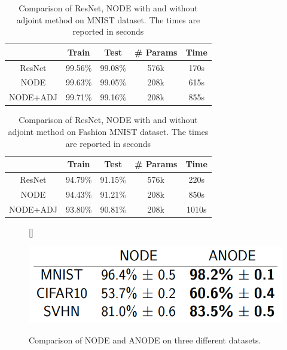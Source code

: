 \documentclass{article}
\begin{document}
	
	\begin{table}
		{\caption{Comparison of ResNet, NODE with and without adjoint method on MNIST dataset. The times are reported in seconds}\label{tbl:bench1}}
		{\begin{tabular}{@{}ccccc@{}}
				\toprule
				& Train   & Test    & \# Params & Time \\ \midrule
				ResNet   & 99.56\% & 99.08\% & 576k      & 170s \\
				NODE     & 99.63\% & 99.05\% & 208k      & 615s \\
				NODE+ADJ & 99.71\% & 99.16\% & 208k      & 855s \\ \bottomrule
		\end{tabular}}
	\end{table}

	\begin{table}
	{\caption{Comparison of ResNet, NODE with and without adjoint method on Fashion MNIST dataset. The times are reported in seconds}\label{tbl:bench2}}
	{\begin{tabular}{@{}ccccc@{}}
			\toprule
			& Train   & Test    & \# Params & Time \\ \midrule
			ResNet   & 94.79\% & 91.15\% & 576k      & 220s \\
			NODE     & 94.43\% & 91.21\% & 208k      & 850s \\
			NODE+ADJ & 93.80\% & 90.81\% & 208k      & 1010s \\ \bottomrule
	\end{tabular}}
\end{table}
	\begin{figure}
		\centering
		[\FBwidth]
		{\caption{Comparison  of NODE and ANODE on three different datasets. }		\label{tbl:anode}}
		{\includegraphics[width=.5\textwidth]{images/anode-3}}

	\end{figure}
	
	

\printbibliography
\end{document}
